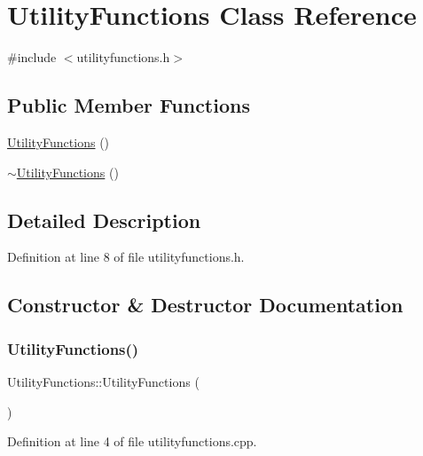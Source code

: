 \hypertarget{classUtilityFunctions}{}\section{Utility\+Functions Class Reference}
\label{classUtilityFunctions}


{\ttfamily \#include $<$utilityfunctions.\+h$>$}

\subsection*{Public Member Functions}
\begin{DoxyCompactItemize}
\item 
\hyperlink{classUtilityFunctions_aa66aa28b5c3ee83f8cf14ec56f841443}{Utility\+Functions} ()
\item 
\hyperlink{classUtilityFunctions_ab92ca1da946cc58713f6d06a4bcd0ff6}{$\sim$\+Utility\+Functions} ()
\end{DoxyCompactItemize}


\subsection{Detailed Description}


Definition at line 8 of file utilityfunctions.\+h.



\subsection{Constructor \& Destructor Documentation}
\hypertarget{classUtilityFunctions_aa66aa28b5c3ee83f8cf14ec56f841443}{}\label{classUtilityFunctions_aa66aa28b5c3ee83f8cf14ec56f841443} 
\subsubsection{\texorpdfstring{Utility\+Functions()}{UtilityFunctions()}}
{\footnotesize\ttfamily Utility\+Functions\+::\+Utility\+Functions (\begin{DoxyParamCaption}{ }\end{DoxyParamCaption})}



Definition at line 4 of file utilityfunctions.\+cpp.

